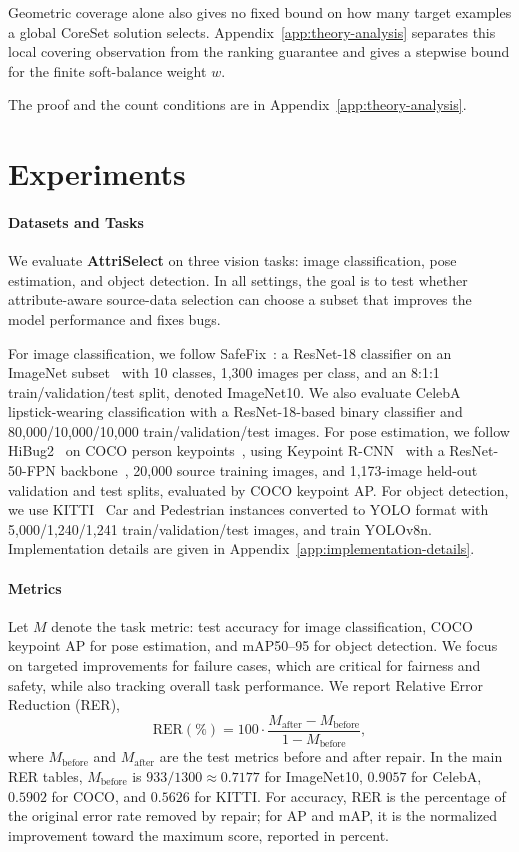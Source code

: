 \documentclass[10pt,twocolumn,letterpaper]{article}
\newcommand{\modelname}{AttriSelect}
\newcommand{\model}{\textcolor{darkteal}{\textbf{\modelname}}\xspace}
\newcommand{\safefix}{SafeFix\xspace}
\begin{document}
Geometric coverage alone also gives no fixed bound on how many target examples a global CoreSet solution selects. Appendix~\ref{app:theory-analysis} separates this local covering observation from the ranking guarantee and gives a stepwise bound for the finite soft-balance weight $w$.

\noindent The proof and the count conditions are in Appendix~\ref{app:theory-analysis}.

\section{Experiments}

\paragraph{Datasets and Tasks}
We evaluate \model on three vision tasks: image classification, pose estimation, and object detection. In all settings, the goal is to test whether attribute-aware source-data selection can choose a subset that improves the model performance and fixes bugs.

For image classification, we follow \safefix~\citep{xu2025safefix}: a ResNet-18 classifier on an ImageNet subset~\citep{deng2009imagenet} with 10 classes, 1,300 images per class, and an 8:1:1 train/validation/test split, denoted ImageNet10. We also evaluate CelebA~\citep{liu2015deep} lipstick-wearing classification with a ResNet-18-based binary classifier and 80,000/10,000/10,000 train/validation/test images. For pose estimation, we follow HiBug2~\citep{chen2025hibug2} on COCO person keypoints~\citep{lin2014microsoft}, using Keypoint R-CNN~\citep{mask-rcnn-2017} with a ResNet-50-FPN backbone~\citep{he2016deep}, 20,000 source training images, and 1,173-image held-out validation and test splits, evaluated by COCO keypoint AP. For object detection, we use KITTI~\citep{geiger2012we} Car and Pedestrian instances converted to YOLO format with 5,000/1,240/1,241 train/validation/test images, and train YOLOv8n. Implementation details are given in Appendix~\ref{app:implementation-details}.

\paragraph{Metrics}
Let $M$ denote the task metric: test accuracy for image classification, COCO keypoint AP for pose estimation, and mAP50--95 for object detection. We focus on targeted improvements for failure cases, which are critical for fairness and safety, while also tracking overall task performance. We report Relative Error Reduction (RER),
\begin{equation}
\mathrm{RER}(\%)=100\cdot\frac{M_{\mathrm{after}}-M_{\mathrm{before}}}{1-M_{\mathrm{before}}},
\end{equation}
where $M_{\mathrm{before}}$ and $M_{\mathrm{after}}$ are the test metrics before and after repair. In the main RER tables, $M_{\mathrm{before}}$ is $933/1300\approx0.7177$ for ImageNet10, $0.9057$ for CelebA, $0.5902$ for COCO, and $0.5626$ for KITTI. For accuracy, RER is the percentage of the original error rate removed by repair; for AP and mAP, it is the normalized improvement toward the maximum score, reported in percent.
\end{document}

